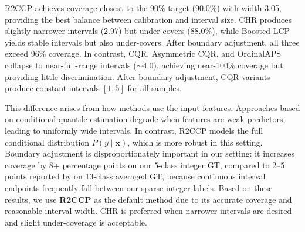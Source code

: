 \documentclass{article}
\begin{document}
R2CCP achieves coverage closest to the 90\% target (90.0\%) with width 3.05, providing the best balance between calibration and interval size. CHR produces slightly narrower intervals (2.97) but under-covers (88.0\%), while Boosted LCP yields stable intervals but also under-covers. After boundary adjustment, all three exceed 96\% coverage. In contrast, CQR, Asymmetric CQR, and OrdinalAPS collapse to near-full-range intervals (${\sim}4.0$), achieving near-100\% coverage but providing little discrimination. After boundary adjustment, CQR variants produce constant intervals $[1,5]$ for all samples.

This difference arises from how methods use the input features. Approaches based on conditional quantile estimation degrade when features are weak predictors, leading to uniformly wide intervals. In contrast, R2CCP models the full conditional distribution $P(y \mid \mathbf{x})$, which is more robust in this setting. Boundary adjustment is disproportionately important in our setting: it increases coverage by 8+ percentage points on our 5-class integer GT, compared to 2--5 points reported by \citet{sheng2025analyzing} on 13-class averaged GT, because continuous interval endpoints frequently fall between our sparse integer labels. Based on these results, we use \textbf{R2CCP} as the default method due to its accurate coverage and reasonable interval width. CHR is preferred when narrower intervals are desired and slight under-coverage is acceptable.
\end{document}
